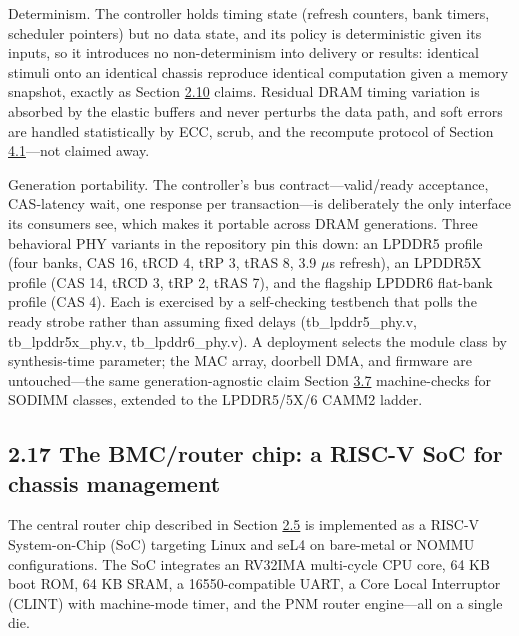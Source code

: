 \documentclass[12pt,onecolumn]{article}
\begin{document}
Determinism. The controller holds timing state (refresh counters, bank timers, scheduler pointers) but no data state, and its policy is deterministic given its inputs, so it introduces no non-determinism into delivery or results: identical stimuli onto an identical chassis reproduce identical computation given a memory snapshot, exactly as Section \hyperref[sec:2.10]{2.10} claims. Residual DRAM timing variation is absorbed by the elastic buffers and never perturbs the data path, and soft errors are handled statistically by ECC, scrub, and the recompute protocol of Section \hyperref[sec:4.1]{4.1}---not claimed away.

Generation portability. The controller's bus contract---valid/ready acceptance, CAS-latency wait, one response per transaction---is deliberately the only interface its consumers see, which makes it portable across DRAM generations. Three behavioral PHY variants in the repository pin this down: an LPDDR5 profile (four banks, CAS 16, tRCD 4, tRP 3, tRAS 8, 3.9 $\mu$s refresh), an LPDDR5X profile (CAS 14, tRCD 3, tRP 2, tRAS 7), and the flagship LPDDR6 flat-bank profile (CAS 4). Each is exercised by a self-checking testbench that polls the ready strobe rather than assuming fixed delays (tb\_lpddr5\_phy.v, tb\_lpddr5x\_phy.v, tb\_lpddr6\_phy.v). A deployment selects the module class by synthesis-time parameter; the MAC array, doorbell DMA, and firmware are untouched---the same generation-agnostic claim Section \hyperref[sec:3.7]{3.7} machine-checks for SODIMM classes, extended to the LPDDR5/5X/6 CAMM2 ladder.

\subsection*{2.17 The BMC/router chip: a RISC-V SoC for chassis management}\label{sec:2.17}

The central router chip described in Section \hyperref[sec:2.5]{2.5} is implemented as a RISC-V System-on-Chip (SoC) targeting Linux and seL4 on bare-metal or NOMMU configurations. The SoC integrates an RV32IMA multi-cycle CPU core, 64 KB boot ROM, 64 KB SRAM, a 16550-compatible UART, a Core Local Interruptor (CLINT) with machine-mode timer, and the PNM router engine---all on a single die.
\end{document}
